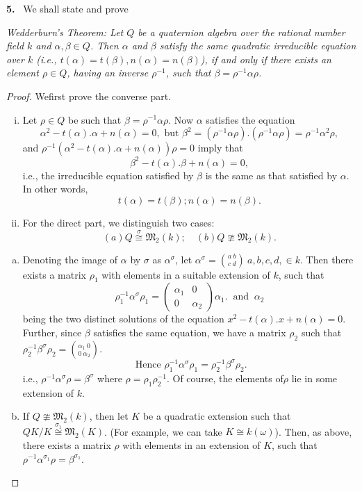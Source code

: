 \textbf{5.}~ We shall state and prove
\begin{theorem} %
  {\em Wedderburn's Theorem: Let $Q$ be a quaternion algebra over the
    rational number field $k$ and $\alpha,  \beta \in Q$. Then
    $\alpha$ and $\beta$ satisfy the same quadratic irreducible
    equation over $k$ (i.e.,  $t(\alpha) = t(\beta),  n(\alpha)
    = n(\beta)$), if and only if there exists an element $\rho \in Q$,
    having an inverse $\rho^{-1}$, such that $\beta = \rho^{-1} \alpha
    \rho$.} 
\end{theorem}

\begin{proof}
  We\pageoriginale first prove the converse part.
\begin{enumerate}[i)]
\item Let $\rho \in Q$ be such that $\beta = \rho^{-1} \alpha
  \rho$. Now $\alpha$ satisfies the equation 
  $$
  \alpha^2 - t(\alpha). \alpha + n(\alpha) = 0,  \text{  but  }
  \beta^2 = (\rho^{-1} \alpha \rho).  (\rho^{-1} \alpha \rho) =
  \rho^{-1} \alpha^2 \rho,  
  $$
  and $\rho^{-1} (\alpha^2 - t (\alpha). \alpha + n(\alpha)) \rho = 0$
  imply that 
  $$
  \beta^2 - t(\alpha). \beta + n(\alpha) = 0, 
  $$
  i.e., the irreducible equation satisfied by $\beta$ is the same as
  that satisfied by $\alpha$. In other words, 
  $$
  t(\alpha) = t(\beta) ; n(\alpha) = n(\beta).
  $$
\item For the direct part, we distinguish two cases:
  $$
  (a) Q \overset{\sigma}{\cong} \mathfrak{M}_2 (k) ; \quad (b) Q
  \ncong \mathfrak{M}_2 (k). 
  $$
\end{enumerate}

\begin{enumerate}[(a)]
\item Denoting the image of $\alpha$ by $\sigma$ as $\alpha^\sigma$,
  let $\alpha^\sigma = \binom{a~ b}{c ~ d}~  a,
  b, c, d, \in k$. Then there exists a matrix $\rho_1$ with elements
  in a suitable extension of $k$, such that 
  $$
  \rho^{-1}_1 \alpha^\sigma \rho_1 = 
  \begin{pmatrix}\alpha_1 & 0\\0 &\alpha_2 \end{pmatrix}
  \alpha_1. ~\text{ and }~ \alpha_2  
  $$
  being the two distinct solutions of the equation $x^2 - t(\alpha). x
  + n (\alpha) = 0$. Further, since $\beta$ satisfies the same
  equation, we have a matrix $\rho_2$ such that $\rho^{-1}_2
  \beta^\sigma \rho_2 = \binom{\alpha_1 ~ 0}{0 ~\alpha_2}$. 
  $$
  \text { Hence  } \rho^{-1}_1 \alpha^\sigma \rho_1 = \rho^{-1}_2
  \beta^\sigma \rho_2. 
  $$
  i.e., $\rho^{-1} \alpha^\sigma \rho = \beta^\sigma$ where $\rho =
  \rho_1 \rho^{-1}_2$. Of course, the elements of\pageoriginale $\rho$ lie in some
  extension of $k$. 
\item If $Q \ncong \mathfrak{M}_2 (k)$, then let $K$ be a quadratic
  extension such that $Q K/K \overset{\sigma_1}{\cong} \mathfrak{M}_2
  (K)$. (For example, we can take $K \cong k(\omega)$). Then, as
  above, there exists a matrix $\rho$ with elements in an extension of
  $K$, such that $\rho^{-1} \alpha^{\sigma_1} \rho =
  \beta^{\sigma_1}$. 
\end{enumerate}
\end{proof}

